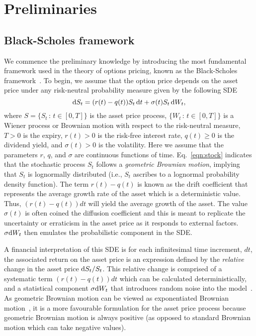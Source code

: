 \chapter{Preliminaries}

\section{Black-Scholes framework}
We commence the preliminary knowledge by introducing the most fundamental framework used in the theory of options pricing, known as the Black-Scholes framework~\cite{Black1973}. To begin, we assume that the option price depends on the asset price under any risk-neutral probability measure given by the following SDE
	\begin{equation}
	\label{eqn:stock}
		\mathrm d S_t = (r(t)-q(t))S_t \, \mathrm d t + \sigma(t)S_t  \, \mathrm d W_t,
	\end{equation}
where $S = \{ S_t \, : \, t \in [0,T] \}$ is the asset price process, $\{ W_t \, : \, t \in [0,T] \}$ is a Wiener process or Brownian motion with respect to the risk-neutral measure, $T > 0$ is the expiry, $r(t) > 0$ is the risk-free interest rate, $q(t) \geq 0$ is the dividend yield, and $\sigma(t) > 0$ is the volatility.
Here we assume that the parameters $r$, $q$, and $\sigma$ are continuous functions of time. Eq.~\eqref{eqn:stock} indicates that the stochastic process $S_t$ follows a
\emph{geometric Brownian motion}, implying that $S_t$ is lognormally distributed (i.e., $S_t$ ascribes to a lognormal probability density function). The term $r(t)-q(t)$ is known as the drift coefficient that represents the average growth rate of the asset which is a deterministic value. Thus, $(r(t)-q(t))dt$ will yield the average growth of the asset.
The value $\sigma(t)$ is often coined the diffusion coefficient and this is meant to replicate the uncertainty or erraticism in the asset price as it responds to external factors. $\sigma \mathrm d W_t$ then emulates the probabilistic component in the SDE.

A financial interpretation of this SDE is for each infinitesimal time increment, $dt$, the associated return on the asset price is an expression defined by the \emph{relative} change in the asset price $\mathrm d S_t/S_t$.
This relative change is comprised of a systematic term $(r(t)-q(t))dt$ which can be calculated deterministically, and a statistical component $\sigma \mathrm d W_t$ that introduces random noise into the model~\cite{Wilmott1995}. As geometric Brownian motion can be viewed as exponentiated Brownian motion~\cite{Glasserman2013}, it is a more favourable formulation for the asset price process
because geometric Brownian motion is always positive (as opposed to standard Brownian motion which can take negative values).

